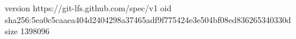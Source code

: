 version https://git-lfs.github.com/spec/v1
oid sha256:5ea0c5caaea404d2404298a37465adf9f775424e3e504bf08ed836265340330d
size 1398096
